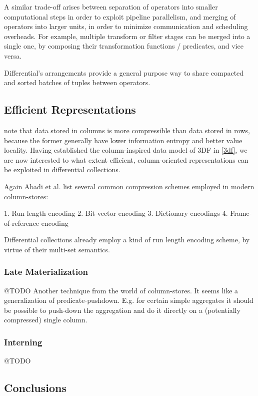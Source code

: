 \documentclass[../index.tex]{subfiles}
\begin{document}
A similar trade-off arises between separation of operators into
smaller computational steps in order to exploit pipeline parallelism,
and merging of operators into larger units, in order to minimize
communication and scheduling overheads. For example, multiple
transform or filter stages can be merged into a single one, by
composing their transformation functions / predicates, and vice versa.

Differential's arrangements provide a general purpose way to share
compacted and sorted batches of tuples between operators.

\subsection{Efficient Representations}

\cite{abadi2013design} note that data stored in columns is more
compressible than data stored in rows, because the former generally
have lower information entropy and better value locality. Having
established the column-inspired data model of 3DF in \ref{3df}, we are
now interested to what extent efficient, column-oriented
representations can be exploited in differential collections.

Again Abadi et al. list several common compression schemes employed in
modern column-stores:

1. Run length encoding
2. Bit-vector encoding
3. Dictionary encodings
4. Frame-of-reference encoding

Differential collections already employ a kind of run length encoding
scheme, by virtue of their multi-set semantics.

\subsubsection{Late Materialization}

@TODO
Another technique from the world of column-stores. It seems like a
generalization of predicate-pushdown. E.g. for certain simple
aggregates it should be possible to push-down the aggregation and do
it directly on a (potentially compressed) single column.

\subsubsection{Interning}

@TODO

\subsection{Conclusions}
\end{document}
